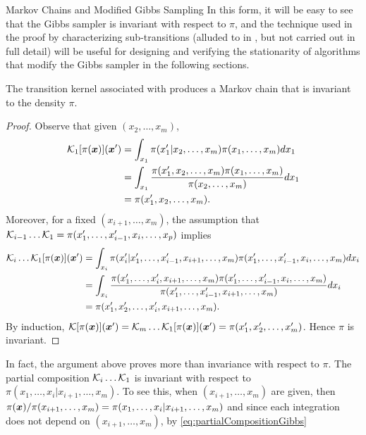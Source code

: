 \begin{chapter}{Markov Chains and Modified Gibbs Sampling}
In this form, it will be easy to see that the Gibbs sampler is invariant with respect to $\pi$, and the technique used in the proof by characterizing sub-transitions (alluded to in \citep{robert2013monte}, but not carried out in full detail) will be useful for designing and verifying the stationarity of algorithms that modify the Gibbs sampler in the following sections.

\begin{prop} The transition kernel associated with  produces a Markov chain that is invariant to the density $\pi$.
\end{prop}
\begin{proof}
  Observe that given $(x_2,\dots,x_m)$,
  \begin{align}
    \mathcal K_1[\pi(\mbox{\boldmath$x$})](\mbox{\boldmath$x$}') 
      &=\int_{x_1} \pi(x_1'|x_2,\dots,x_m) \pi(x_1,\dots,x_m)dx_1\nonumber\\
      &=\int_{x_1} \frac{\pi(x_1',x_2,\dots,x_m) \pi(x_1,\dots,x_m)}{\pi(x_2,\dots,x_m)}dx_1\nonumber\\
      &=\pi(x_1',x_2,\dots,x_m).
  \end{align}
  Moreover, for a fixed $(x_{i+1},\dots,x_m)$, the assumption that $\mathcal K_{i-1} \dots  \mathcal K_1 = \pi(x_1',\dots,x_{i-1}',x_i,\dots,x_p)$ implies
  \begin{align}
    \mathcal K_i \dots  \mathcal K_1[\pi(\mbox{\boldmath$x$})](\mbox{\boldmath$x$}') 
      &=\int_{x_i} \pi(x_i'|x_1',\dots,x_{i-1}',x_{i+1},\dots,x_m) \pi(x_1',\dots,x_{i-1}',x_i,\dots,x_m)dx_i\nonumber\\
      &=\int_{x_i} \frac{\pi(x_1',\dots,x_{i}',x_{i+1},\dots,x_m) \pi(x_1',\dots,x_{i-1}',x_i,\dots,x_m)}{\pi(x_1',\dots,x_{i-1}',x_{i+1},\dots,x_m)}dx_i\nonumber\\
      &=\pi(x_1',x_2',\dots,x_i',x_{i+1},\dots,x_m).\label{eq:partialCompositionGibbs}
  \end{align}
  By induction, $\mathcal K [\pi(\mbox{\boldmath$x$})](\mbox{\boldmath$x$}') = \mathcal K_m\dots \mathcal K_1 [\pi(\mbox{\boldmath$x$})](\mbox{\boldmath$x$}') = \pi(x_1',x_2',\dots,x_m')$.
  Hence $\pi$ is invariant.
\end{proof}
In fact, the argument above proves more than invariance with respect to $\pi$.
The partial composition $\mathcal K_i\dots\mathcal K_1$ is invariant with respect to $\pi(x_1,\dots,x_i|x_{i+1},\dots,x_m)$. 
To see this, when $(x_{i+1},\dots,x_m)$ are given, then $\pi(\mbox{\boldmath$x$})/\pi(x_{i+1},\dots,x_m)= \pi(x_1,\dots,x_{i}|x_{i+1},\dots,x_m)$ and since each integration does not depend on $(x_{i+1},\dots,x_m)$, by \eqref{eq:partialCompositionGibbs}
\begin{equation} \label{eq:conditionalInvariance}

\end{equation}
\end{chapter}
